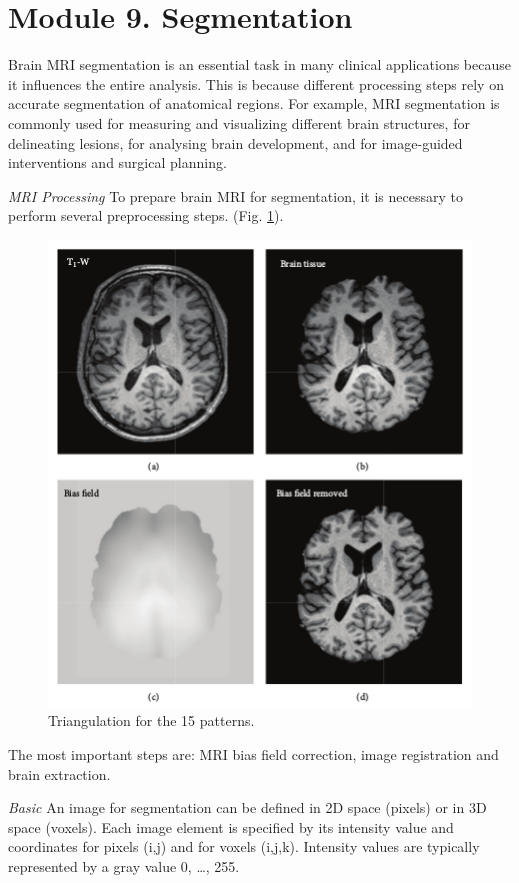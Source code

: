 \section{Module 9. Segmentation}

Brain MRI segmentation is an essential task in many clinical applications
because it influences the entire analysis. This is because different
processing steps rely on accurate segmentation of anatomical regions.
For example, MRI segmentation is commonly used for measuring and visualizing
different brain structures, for delineating lesions, for analysing
brain development, and for image-guided interventions and surgical
planning.

\textit{MRI Processing} To prepare brain MRI for segmentation, it
is necessary to perform several preprocessing steps. (Fig. \ref{fig:figures/Preprocessing}).

\begin{figure}[H]
\centering{}\includegraphics[scale=0.7]{figures/9Preprocessing}\caption{Triangulation for the 15 patterns. \label{fig:figures/Preprocessing}}
\end{figure}

The most important steps are: MRI bias field correction, image registration
and brain extraction.

\textit{Basic} An image for segmentation can be defined in 2D space
(pixels) or in 3D space (voxels). Each image element is specified
by its intensity value and coordinates for pixels (i,j) and for voxels
(i,j,k). Intensity values are typically represented by a gray value
{0, …, 255}.


